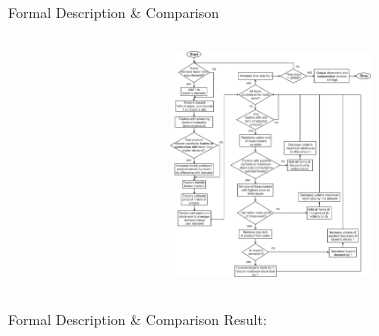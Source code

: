 \documentclass[12pt, notes=show]{beamer}
\begin{document}
\begin{frame}{Formal Description \& Comparison}
{\begin{center}
\begin{columns}
\begin{column}{.4\textwidth}
		    \end{column}
		    \begin{column}{.4\textwidth}

		\includegraphics[height=6cm]{images/formalModel.png}
		    \end{column}
		\end{columns}
	    \end{center}
    }

\end{frame}
\begin{frame}{Formal Description \& Comparison}
	Result:\\
	\begin{center}

	\end{center}

\end{frame}
\end{document}
